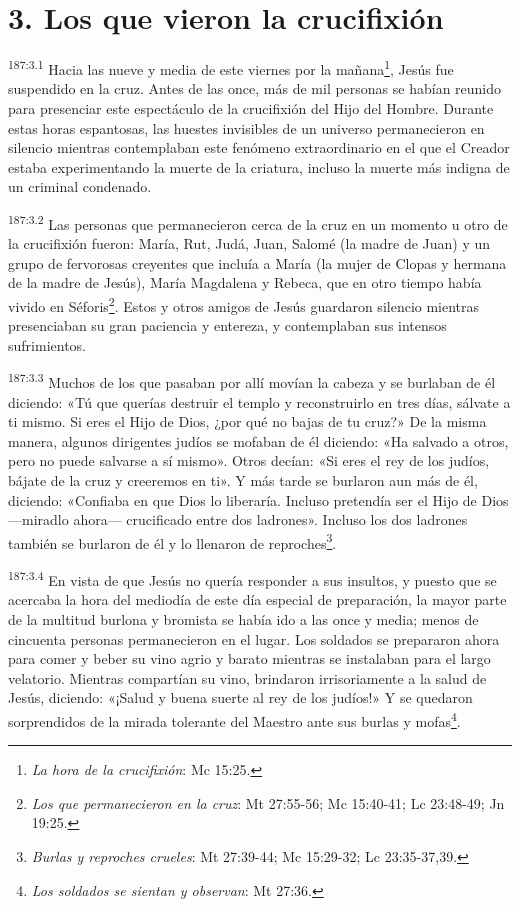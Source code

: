 \section*{3. Los que vieron la crucifixión}
\par 
\textsuperscript{187:3.1} Hacia las nueve y media de este viernes por la mañana\footnote{\textit{La hora de la crucifixión}: Mc 15:25.}, Jesús fue suspendido en la cruz. Antes de las once, más de mil personas se habían reunido para presenciar este espectáculo de la crucifixión del Hijo del Hombre. Durante estas horas espantosas, las huestes invisibles de un universo permanecieron en silencio mientras contemplaban este fenómeno extraordinario en el que el Creador estaba experimentando la muerte de la criatura, incluso la muerte más indigna de un criminal condenado.

\par 
\textsuperscript{187:3.2} Las personas que permanecieron cerca de la cruz en un momento u otro de la crucifixión fueron: María, Rut, Judá, Juan, Salomé (la madre de Juan) y un grupo de fervorosas creyentes que incluía a María (la mujer de Clopas y hermana de la madre de Jesús), María Magdalena y Rebeca, que en otro tiempo había vivido en Séforis\footnote{\textit{Los que permanecieron en la cruz}: Mt 27:55-56; Mc 15:40-41; Lc 23:48-49; Jn 19:25.}. Estos y otros amigos de Jesús guardaron silencio mientras presenciaban su gran paciencia y entereza, y contemplaban sus intensos sufrimientos.

\par 
\textsuperscript{187:3.3} Muchos de los que pasaban por allí movían la cabeza y se burlaban de él diciendo: «Tú que querías destruir el templo y reconstruirlo en tres días, sálvate a ti mismo. Si eres el Hijo de Dios, ¿por qué no bajas de tu cruz?» De la misma manera, algunos dirigentes judíos se mofaban de él diciendo: «Ha salvado a otros, pero no puede salvarse a sí mismo». Otros decían: «Si eres el rey de los judíos, bájate de la cruz y creeremos en ti». Y más tarde se burlaron aun más de él, diciendo: «Confiaba en que Dios lo liberaría. Incluso pretendía ser el Hijo de Dios ---miradlo ahora--- crucificado entre dos ladrones». Incluso los dos ladrones también se burlaron de él y lo llenaron de reproches\footnote{\textit{Burlas y reproches crueles}: Mt 27:39-44; Mc 15:29-32; Lc 23:35-37,39.}.

\par 
\textsuperscript{187:3.4} En vista de que Jesús no quería responder a sus insultos, y puesto que se acercaba la hora del mediodía de este día especial de preparación, la mayor parte de la multitud burlona y bromista se había ido a las once y media; menos de cincuenta personas permanecieron en el lugar. Los soldados se prepararon ahora para comer y beber su vino agrio y barato mientras se instalaban para el largo velatorio. Mientras compartían su vino, brindaron irrisoriamente a la salud de Jesús, diciendo: «¡Salud y buena suerte al rey de los judíos!» Y se quedaron sorprendidos de la mirada tolerante del Maestro ante sus burlas y mofas\footnote{\textit{Los soldados se sientan y observan}: Mt 27:36.}.

